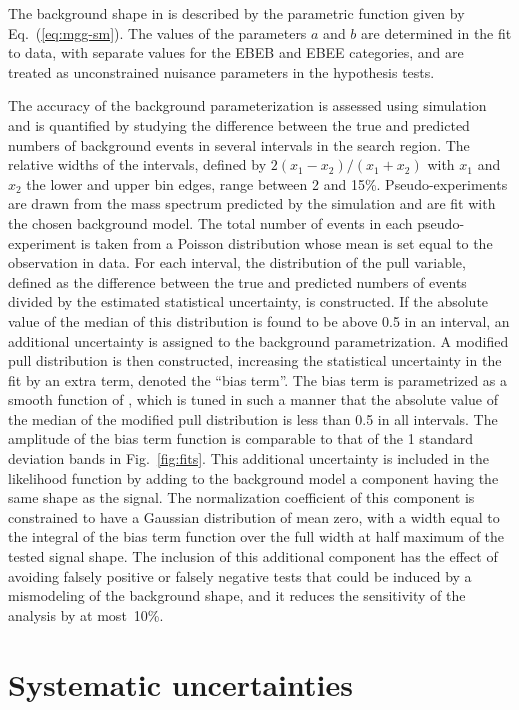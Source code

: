The background shape in \mgg is described by the
parametric function given by Eq.~(\ref{eq:mgg-sm}).
The values of the parameters $a$ and $b$ are determined in the fit to data,
with separate values for the EBEB and EBEE categories,
and are treated as unconstrained nuisance parameters in the hypothesis tests.

The accuracy of the background parameterization is assessed using
simulation and is quantified by studying the difference between the true and
predicted numbers of background events in several \mgg intervals in the search region.
The relative widths of the intervals,
defined by $2(x_1-x_2)/(x_1+x_2)$ with $x_1$ and $x_2$ the lower and upper bin edges,
range between 2 and 15\%.
Pseudo-experiments are drawn from the mass spectrum predicted
by the simulation and are fit with the chosen background model.
The total number of events in each pseudo-experiment is taken from a Poisson
distribution whose mean is set equal to the observation in data.
For each interval,
the distribution of the pull variable,
defined as the difference between the true and predicted numbers of
events divided by the estimated statistical uncertainty,
is constructed.
If the absolute value of the median of this distribution is
found to be above 0.5 in an interval,
an additional uncertainty is assigned to the background parametrization.
A modified pull distribution is then constructed,
increasing the statistical uncertainty in the fit by an extra term,
denoted the ``bias term''.
The bias term is parametrized as a smooth function of \mgg,
which is tuned in such a manner that the absolute value of the median of the
modified pull distribution is less than 0.5 in all intervals.
The amplitude of the bias term function is comparable to that of the 1 standard deviation
bands in Fig.~\ref{fig:fits}.
This additional uncertainty is included in the likelihood function by adding
to the background model a component having the same shape as the signal.
The normalization coefficient of this component is constrained to have a Gaussian
distribution of mean zero,
with a width equal to the integral of the bias term
function over the full width at half maximum of the tested signal shape.
The inclusion of this additional component has the effect of avoiding
falsely positive or falsely negative tests that could be induced by a
mismodeling of the background shape, and it reduces the sensitivity of the
analysis by at most~10\%.

\section{Systematic uncertainties}

